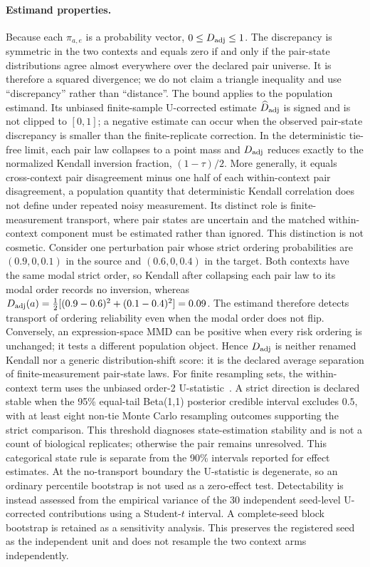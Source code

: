 \documentclass{article}
\begin{document}
\paragraph{Estimand properties.}
Because each $\pi_{a,e}$ is a probability vector, $0\leq D_{\rm adj}\leq 1$.
The discrepancy is symmetric in the two contexts and equals zero if and only
if the pair-state distributions agree almost everywhere over the declared
pair universe. It is therefore a squared divergence; we do not claim a
triangle inequality and use ``discrepancy'' rather than ``distance''.
The bound applies to the population estimand. Its unbiased finite-sample
U-corrected estimate $\widehat D_{\rm adj}$ is signed and is not clipped to
$[0,1]$; a negative estimate can occur when the observed pair-state
discrepancy is smaller than the finite-replicate correction. In the
deterministic tie-free limit, each pair law collapses to a point mass and
  $D_{\rm adj}$ reduces exactly to the normalized Kendall inversion fraction,
  $(1-\tau)/2$. More generally, it equals cross-context pair disagreement minus
  one half of each within-context pair disagreement, a population quantity that
  deterministic Kendall correlation does not define under repeated noisy
  measurement. Its distinct role is finite-measurement transport, where pair
states are uncertain and the matched within-context component must be
estimated rather than ignored.
This distinction is not cosmetic. Consider one perturbation pair whose strict
ordering probabilities are $(0.9,0,0.1)$ in the source and $(0.6,0,0.4)$ in
  the target. Both contexts have the same modal strict order, so Kendall after
  collapsing each pair law to its modal order records no inversion, whereas
$D_{\rm adj}(a)=\tfrac12[(0.9-0.6)^2+(0.1-0.4)^2]=0.09$. The estimand therefore
  detects transport of ordering reliability even when the modal order does not
  flip. Conversely, an expression-space MMD can be positive when every risk
ordering is unchanged; it tests a different population object. Hence
$D_{\rm adj}$ is neither renamed Kendall nor a generic distribution-shift
score: it is the declared average separation of finite-measurement pair-state
laws.
For finite resampling sets, the within-context term uses the unbiased order-2
U-statistic~\citep{hoeffding1948class}. A strict direction is declared stable when the 95\% equal-tail
  Beta(1,1) posterior credible interval excludes $0.5$, with at least eight
  non-tie Monte Carlo resampling outcomes supporting the strict comparison.
  This threshold diagnoses state-estimation stability and is not a count of
  biological replicates; otherwise the pair
remains unresolved. This categorical state rule is separate from the 90\%
intervals reported for effect estimates.
At the no-transport boundary the U-statistic is degenerate, so an ordinary
percentile bootstrap is not used as a zero-effect test. Detectability is
instead assessed from the empirical variance of the 30 independent
seed-level U-corrected contributions using a Student-$t$ interval. A
complete-seed block bootstrap is retained as a sensitivity analysis. This
preserves the registered seed as the independent unit and does not resample
the two context arms independently.
\end{document}
